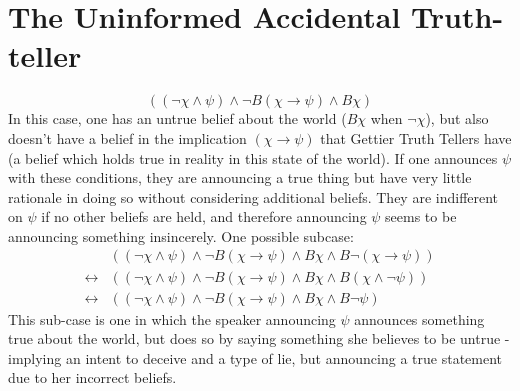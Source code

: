 \documentclass[12pt, titlepage, twoside]{report}
\begin{document}
\section{The Uninformed Accidental Truth-teller}
$$((\neg \chi \wedge \psi) \wedge \neg B(\chi \to \psi) \wedge B \chi)$$
In this case, one has an untrue belief about the world ($B\chi$ when $\neg \chi$), but also doesn’t have a belief in the implication $(\chi \to \psi)$ that Gettier Truth Tellers have (a belief which holds true in reality in this state of the world). If one announces $\psi$ with these conditions, they are announcing a true thing but have very little rationale in doing so without considering additional beliefs. They are indifferent on $\psi$ if no other beliefs are held, and therefore announcing $\psi$ seems to be announcing something insincerely. One possible subcase:
\begin{align*}
&((\neg \chi \wedge \psi) \wedge \neg B(\chi \to \psi) \wedge B \chi \wedge B \neg (\chi \to \psi ))\\
\leftrightarrow &((\neg \chi \wedge \psi) \wedge \neg B(\chi \to \psi) \wedge B \chi \wedge B (\chi \wedge \neg \psi ))\\
\leftrightarrow &((\neg \chi \wedge \psi) \wedge \neg B(\chi \to \psi) \wedge B \chi \wedge B \neg \psi)
\end{align*}
This sub-case is one in which the speaker announcing $\psi$ announces something true about the world, but does so by saying something she believes to be untrue - implying an intent to deceive and a type of lie, but announcing a true statement due to her incorrect beliefs. 
\end{document}
